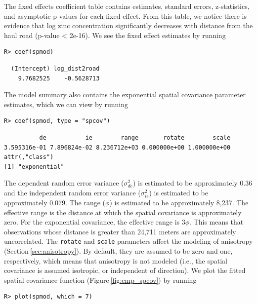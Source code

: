 \documentclass{article}
\begin{document}
The fixed effects coefficient table contains estimates, standard errors,
z-statistics, and asymptotic p-values for each fixed effect. From this
table, we notice there is evidence that log zinc concentration
significantly decreases with distance from the haul road (p-value
\textless{} 2e-16). We see the fixed effect estimates by running

\begin{verbatim}
R> coef(spmod)
\end{verbatim}

\begin{verbatim}
  (Intercept) log_dist2road 
    9.7682525    -0.5628713 
\end{verbatim}

The model summary also contains the exponential spatial covariance
parameter estimates, which we can view by running

\begin{verbatim}
R> coef(spmod, type = "spcov")
\end{verbatim}

\begin{verbatim}
          de           ie        range       rotate        scale 
3.595316e-01 7.896824e-02 8.236712e+03 0.000000e+00 1.000000e+00 
attr(,"class")
[1] "exponential"
\end{verbatim}

The dependent random error variance (\(\sigma^2_{de}\)) is estimated to
be approximately 0.36 and the independent random error variance
(\(\sigma^2_{ie}\)) is estimated to be approximately 0.079. The range
(\(\phi\)) is estimated to be approximately 8,237. The effective range
is the distance at which the spatial covariance is approximately zero.
For the exponential covariance, the effective range is \(3\phi\). This
means that observations whose distance is greater than 24,711 meters are
approximately uncorrelated. The \texttt{rotate} and \texttt{scale}
parameters affect the modeling of anisotropy
(Section\(~\)\ref{sec:anisotropy}). By default, they are assumed to be
zero and one, respectively, which means that anisotropy is not modeled
(i.e., the spatial covariance is assumed isotropic, or independent of
direction). We plot the fitted spatial covariance function
(Figure\(~\)\ref{fig:emp_spcov}) by running

\begin{verbatim}
R> plot(spmod, which = 7)
\end{verbatim}
\end{document}
